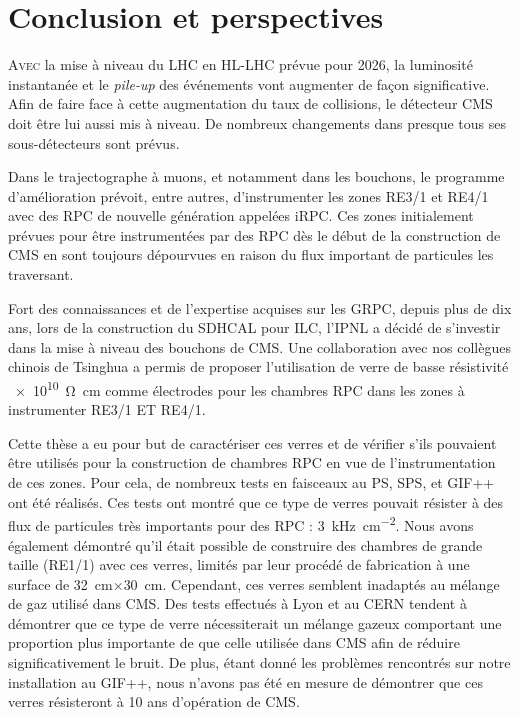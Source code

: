 \chapter{Conclusion et perspectives}
\renewcommand\chapterillustration{CON/CON}
\ThisULCornerWallPaper{1}{\chapterillustration}
\vspace*{-0.5cm}
\lettrine[lines=4, slope=-0.5em,nindent=10pt]{A}{vec} la mise à niveau du LHC en HL-LHC prévue pour \num{2026}, la luminosité instantanée et le \textit{pile-up} des événements vont augmenter de façon significative. Afin de faire face à cette augmentation du taux de collisions, le détecteur CMS doit être lui aussi mis à niveau. De nombreux changements dans presque tous ses sous-détecteurs sont prévus.

Dans le trajectographe à muons, et notamment dans les bouchons, le programme d'amélioration prévoit, entre autres, d'instrumenter les zones RE3/1 et RE4/1 avec des RPC de nouvelle génération appelées iRPC. Ces zones initialement prévues pour être instrumentées par des RPC dès le début de la construction de CMS en sont toujours dépourvues en raison du flux important de particules les traversant.

Fort des connaissances et de l'expertise acquises sur les GRPC, depuis plus de dix ans, lors de la construction du SDHCAL pour ILC, l'IPNL a décidé de s'investir dans la mise à niveau des bouchons de CMS. Une collaboration avec nos collègues chinois de Tsinghua a permis de proposer l'utilisation de verre de basse résistivité \SI{e10}{\ohm\centi\meter} comme électrodes pour les chambres RPC dans les zones à instrumenter RE3/1 ET RE4/1. 

Cette thèse a eu pour but de caractériser ces verres et de vérifier s'ils pouvaient être utilisés pour la construction de chambres RPC en vue de l'instrumentation de ces zones. Pour cela, de nombreux tests en faisceaux au PS, SPS, et GIF++ ont été réalisés. Ces tests ont montré que ce type de verres pouvait résister à des flux de particules très importants pour des RPC : \SI{3}{\kilo\hertz\per\square\centi\meter}. Nous avons également démontré qu'il était possible de construire des chambres de grande taille (RE1/1) avec ces verres, limités par leur procédé de fabrication à une surface de \SI{32}{\centi\meter}$\times$\SI{30}{\centi\meter}. Cependant, ces verres semblent inadaptés au mélange de gaz utilisé dans CMS. Des tests effectués à Lyon et au CERN tendent à démontrer que ce type de verre nécessiterait un mélange gazeux comportant une proportion plus importante de  que celle utilisée dans CMS afin de réduire significativement le bruit. De plus, étant donné les problèmes rencontrés sur notre installation au GIF++, nous n'avons pas été en mesure de démontrer que ces verres résisteront à \num{10} ans d'opération de CMS.

